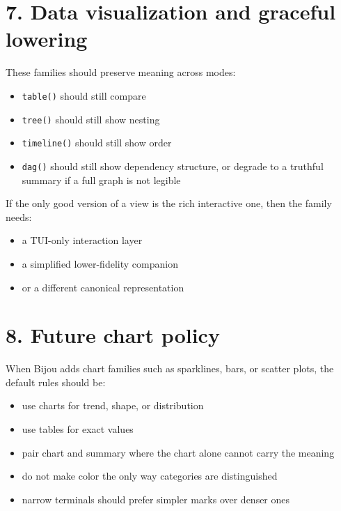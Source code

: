 \section{7. Data visualization and graceful lowering}\label{record-020-data-visualization-and-graceful-lowering}

These families should preserve meaning across modes:

\begin{itemize}
\tightlist
\item
  \texttt{t\allowbreak{}a\allowbreak{}b\allowbreak{}l\allowbreak{}e\allowbreak{}(\allowbreak{})} should still compare
\item
  \texttt{t\allowbreak{}r\allowbreak{}e\allowbreak{}e\allowbreak{}(\allowbreak{})} should still show nesting
\item
  \texttt{t\allowbreak{}i\allowbreak{}m\allowbreak{}e\allowbreak{}l\allowbreak{}i\allowbreak{}n\allowbreak{}e\allowbreak{}(\allowbreak{})} should still show order
\item
  \texttt{d\allowbreak{}a\allowbreak{}g\allowbreak{}(\allowbreak{})} should still show dependency structure, or degrade to a truthful summary if a full graph is not legible
\end{itemize}

If the only good version of a view is the rich interactive one, then the family needs:

\begin{itemize}
\tightlist
\item
  a TUI-only interaction layer
\item
  a simplified lower-fidelity companion
\item
  or a different canonical representation
\end{itemize}

\section{8. Future chart policy}\label{record-020-future-chart-policy}

When Bijou adds chart families such as sparklines, bars, or scatter plots, the default rules should be:

\begin{itemize}
\tightlist
\item
  use charts for trend, shape, or distribution
\item
  use tables for exact values
\item
  pair chart and summary where the chart alone cannot carry the meaning
\item
  do not make color the only way categories are distinguished
\item
  narrow terminals should prefer simpler marks over denser ones
\end{itemize}

